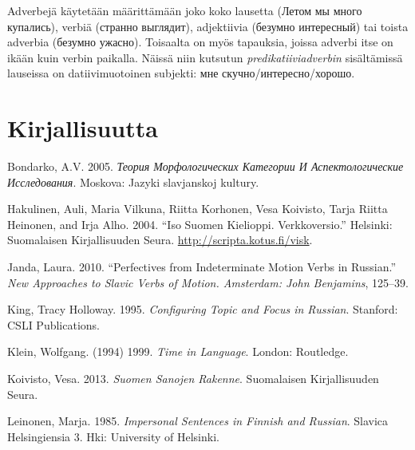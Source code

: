 \documentclass[]{scrreprt}
\begin{document}
Adverbejä käytetään määrittämään joko koko lausetta (Летом мы много
купались), verbiä (странно выглядит), adjektiivia (безумно интересный)
tai toista adverbia (безумно ужасно). Toisaalta on myös tapauksia,
joissa adverbi itse on ikään kuin verbin paikalla. Näissä niin kutsutun
\emph{predikatiiviadverbin} sisältämissä lauseissa on datiivimuotoinen
subjekti: мне скучно/интересно/хорошо.

\chapter*{Kirjallisuutta}\label{kirjallisuutta}


Bondarko, A.V. 2005. \emph{Теория Морфологических Категории И
Аспектологические Исследования}. Moskova: Jazyki slavjanskoj kultury. \\

Hakulinen, Auli, Maria Vilkuna, Riitta Korhonen, Vesa Koivisto, Tarja
Riitta Heinonen, and Irja Alho. 2004. ``Iso Suomen Kielioppi.
Verkkoversio.'' Helsinki: Suomalaisen Kirjallisuuden Seura.
\url{http://scripta.kotus.fi/visk}. \\

Janda, Laura. 2010. ``Perfectives from Indeterminate Motion Verbs in
Russian.'' \emph{New Approaches to Slavic Verbs of Motion. Amsterdam:
John Benjamins}, 125--39. \\

King, Tracy Holloway. 1995. \emph{Configuring Topic and Focus in
Russian}. Stanford: CSLI Publications. \\

Klein, Wolfgang. (1994) 1999. \emph{Time in Language}. London:
Routledge. \\

Koivisto, Vesa. 2013. \emph{Suomen Sanojen Rakenne}. Suomalaisen
Kirjallisuuden Seura. \\

Leinonen, Marja. 1985. \emph{Impersonal Sentences in Finnish and
Russian}. Slavica Helsingiensia 3. Hki: University of Helsinki. \\
\end{document}
